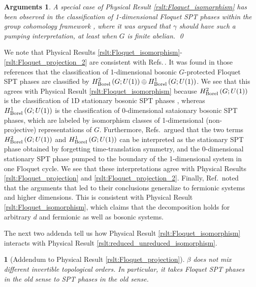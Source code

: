 \documentclass[sort&compress]{elsarticle}
\theoremstyle{theoremstyle}
\theoremstyle{framedtheoremstyle}
\theoremstyle{definitionstyle}
\theoremstyle{definitionstyle}
\theoremstyle{definitionstyle}
\theoremstyle{definitionstyle}
\theoremstyle{nameddefinitionstyle}
\theoremstyle{framednameddefinitionstyle}
\newtheorem*{framednameddef}{}
\theoremstyle{proofstyle}
\newtheorem{ag}{Arguments}
\theoremstyle{definitionstyle}
\newcommand{\paren}[1]{\left( #1 \right)}
\begin{document}
\begin{ag}
A special case of Physical Result \ref{rslt:Floquet_isomorphism} has been observed in the classification of 1-dimensional Floquet SPT phases within the group cohomology framework \cite{Keyserlingk_Floquet, Else_Floquet, Potter_Floquet}, where it was argued that $\gamma$ should have such a pumping interpretation, at least when $G$ is finite abelian.
\qed\end{ag}

We note that Physical Results \ref{rslt:Floquet_isomorphism}-\ref{rslt:Floquet_projection_2} are consistent with Refs.\,\cite{Keyserlingk_Floquet, Else_Floquet, Potter_Floquet}. It was found in those references that the classification of 1-dimensional bosonic $G$-protected Floquet SPT phases are classified by $H^2_{\rm Borel}\paren{G;U(1)} \oplus H^1_{\rm Borel}\paren{G;U(1)}$. We see that this agrees with Physical Result \ref{rslt:Floquet_isomorphism} because $H^2_{\rm Borel}\paren{G;U(1)}$ is the classification of 1D stationary bosonic SPT phases \cite{Wen_Boson}, whereas $H^1_{\rm Borel}\paren{G;U(1)}$ is the classification of 0-dimensional sataionary bosonic SPT phases, which are labeled by isomorphism classes of 1-dimensional (non-projective) representations of $G$. Furthermore, Refs.\,\cite{Keyserlingk_Floquet, Else_Floquet, Potter_Floquet} argued that the two terms $H^2_{\rm Borel}\paren{G;U(1)}$ and $H^1_{\rm Borel}\paren{G;U(1)}$ can be interpreted as the stationary SPT phase obtained by forgetting time-translation symmetry, and the 0-dimensional stationary SPT phase pumped to the boundary of the 1-dimensional system in one Floquet cycle. We see that these interpretations agree with Physical Results \ref{rslt:Floquet_projection} and \ref{rslt:Floquet_projection_2}. Finally, Ref.\,\cite{Else_Floquet} noted that the arguments that led to their conclusions generalize to fermionic systems and higher dimensions. This is consistent with Physical Result \ref{rslt:Floquet_isomorphism}, which claims that the decomposition holds for arbitrary $d$ and fermionic as well as bosonic systems.

The next two addenda tell us how Physical Result \ref{rslt:Floquet_isomorphism} interacts with Physical Result \ref{rslt:reduced_unreduced_isomorphism}.

\begin{framed}\begin{framednameddef}[Addendum to Physical Result \ref{rslt:Floquet_projection}]
$\beta$ does not mix different invertible topological orders.
In particular, it takes Floquet SPT phases in the old sense to SPT phases in the old sense.
\end{framednameddef}\end{framed}
\end{document}
